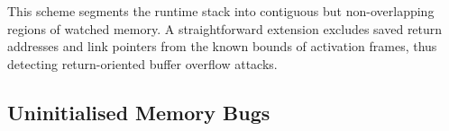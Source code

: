 \documentclass[letterpaper,twocolumn,10pt]{article}
\begin{document}
This scheme segments the runtime stack into contiguous but non-overlapping regions of watched memory. A straightforward extension excludes saved return addresses and link pointers from the known bounds of activation frames, thus detecting return-oriented buffer overflow attacks.








\subsection{Uninitialised Memory Bugs\label{sec:uninitialised_memory}}
\end{document}
